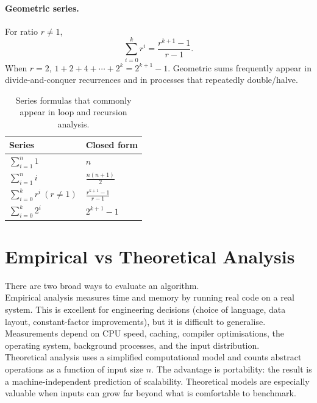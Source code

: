 \documentclass[12pt]{scrartcl}
\begin{document}
\paragraph{Geometric series.}
For ratio \(r\neq 1\),
\[
	\sum_{i=0}^{k} r^i=\frac{r^{k+1}-1}{r-1}.
\]
When \(r=2\), \(1+2+4+\cdots+2^k=2^{k+1}-1\). Geometric sums frequently appear in divide-and-conquer recurrences and in processes that repeatedly double/halve.

\begin{table}[h]
	\centering
	\caption{Series formulas that commonly appear in loop and recursion analysis.}
	\begin{tabular}{@{}p{} p{}@{}}
		\toprule
		Series                            & Closed form               \\ \midrule
		\(\sum_{i=1}^{n} 1\)              & \(n\)                     \\
		\(\sum_{i=1}^{n} i\)              & \(\frac{n(n+1)}{2}\)      \\
		\(\sum_{i=0}^{k} r^i\ (r\neq 1)\) & \(\frac{r^{k+1}-1}{r-1}\) \\
		\(\sum_{i=0}^{k} 2^i\)            & \(2^{k+1}-1\)             \\
		\bottomrule
	\end{tabular}
\end{table}

\section{Empirical vs Theoretical Analysis}
There are two broad ways to evaluate an algorithm.\\ [0.2cm]
Empirical analysis measures time and memory by running real code on a real system. This is excellent for engineering decisions (choice of language, data layout, constant-factor improvements), but it is difficult to generalise. Measurements depend on CPU speed, caching, compiler optimisations, the operating system, background processes, and the input distribution. \\ [0.2cm]
Theoretical analysis uses a simplified computational model and counts abstract operations as a function of input size \(n\). The advantage is portability: the result is a machine-independent prediction of scalability. Theoretical models are especially valuable when inputs can grow far beyond what is comfortable to benchmark.
\end{document}
